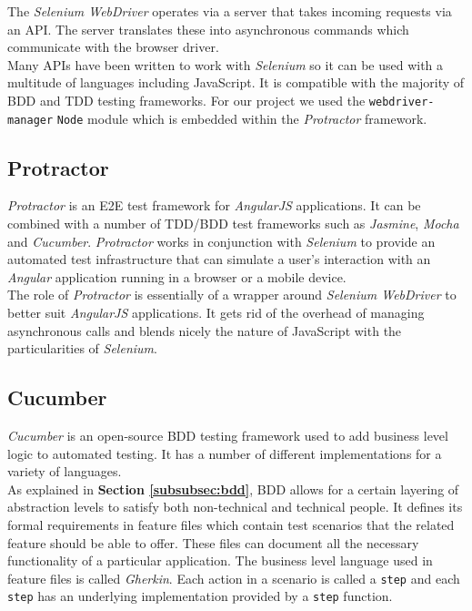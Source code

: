 The \textit{Selenium WebDriver} operates via a server that takes incoming requests via an API. The server translates these into asynchronous commands which communicate with the browser driver.
\\

Many APIs have been written to work with \textit{Selenium} so it can be used with a multitude of languages including JavaScript. It is compatible with the majority of BDD and TDD testing frameworks. For our project we used the \texttt{webdriver-manager} \texttt{Node} module which is embedded within the \textit{Protractor} framework.

\subsection{Protractor}
\label{subsec:protractor}
\textit{Protractor} is an E2E test framework for \textit{AngularJS} applications. It can be combined with a number of TDD/BDD test frameworks such as \textit{Jasmine}, \textit{Mocha} and \textit{Cucumber}. \textit{Protractor} works in conjunction with \textit{Selenium} to provide an automated test infrastructure that can simulate a user’s interaction with an \textit{Angular} application running in a browser or a mobile device.
\\

The role of \textit{Protractor} is essentially of a wrapper around \textit{Selenium WebDriver} to better suit \textit{AngularJS} applications. It gets rid of the overhead of managing asynchronous calls and blends nicely the nature of JavaScript with the particularities of \textit{Selenium}.

\subsection{Cucumber}
\label{subsec:cucumber}
\textit{Cucumber} is an open-source BDD testing framework used to add business level logic to automated testing. It has a number of different implementations for a variety of languages.
\\

As explained in \textbf{Section \ref{subsubsec:bdd}}, BDD allows for a certain layering of abstraction levels to satisfy both non-technical and technical people. It defines its formal requirements in feature files which contain test scenarios that the related feature should be able to offer. These files can document all the necessary functionality of a particular application. The business level language used in feature files is called \textit{Gherkin}. Each action in a scenario is called a \texttt{step} and each \texttt{step} has an underlying implementation provided by a \texttt{step} function.
\\

